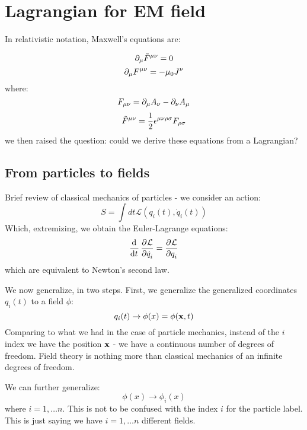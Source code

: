 \section{Lagrangian for EM field}

In relativistic notation, Maxwell's equations are:

\begin{equation}
    \partial_\mu \tilde{F}^{\mu\nu} = 0
\end{equation}
\begin{equation}
    \partial_\mu F^{\mu\nu} = -\mu_0 J^{\nu}
\end{equation}
where:
\begin{equation}
    F_{\mu\nu} = \partial_\mu A_\nu - \partial_\nu A_\mu
\end{equation}
\begin{equation}
    \tilde{F}^{\mu\nu} = \frac{1}{2}\epsilon^{\mu\nu\rho\sigma}F_{\rho\sigma}
\end{equation}
we then raised the question: could we derive these equations from a Lagrangian?

\subsection{From particles to fields}
Brief review of classical mechanics of particles - we consider an action:
\begin{equation}
    S = \int dt \mathcal{L}(q_i(t), \dot{q}_i(t))
\end{equation}
Which, extremizing, we obtain the Euler-Lagrange equations:
\begin{equation}
    \dod{}{t}\dpd{\LL}{\dot{q}_i} = \dpd{\LL}{q_i}
\end{equation}
which are equivalent to Newton's second law.

We now generalize, in two steps. First, we generalize the generalized coordinates $q_i(t)$ to a field $\phi$:
\begin{equation}
    q_i(t) \to \phi(x) = \phi(\mathbf{x}, t)
\end{equation}
Comparing to what we had in the case of particle mechanics, instead of the $i$ index we have the position $\mathbf{x}$ - we have a continuous number of degrees of freedom. Field theory is nothing more than classical mechanics of an infinite degrees of freedom.

We can further generalize:
\begin{equation}
    \phi(x) \to \phi_i(x)
\end{equation}
where $i = 1, \ldots n$. This is not to be confused with the index $i$ for the particle label. This is just saying we have $i = 1, \ldots n$ different fields.

